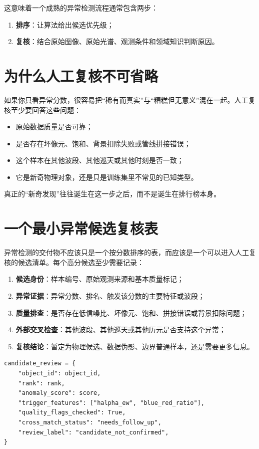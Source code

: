 这意味着一个成熟的异常检测流程通常包含两步：

\begin{enumerate}
    \item \textbf{排序}：让算法给出候选优先级；
    \item \textbf{复核}：结合原始图像、原始光谱、观测条件和领域知识判断原因。
\end{enumerate}

\section{为什么人工复核不可省略}

如果你只看异常分数，很容易把“稀有而真实”与“糟糕但无意义”混在一起。人工复核至少要回答这些问题：

\begin{itemize}
    \item 原始数据质量是否可靠；
    \item 是否存在坏像元、饱和、背景扣除失败或管线拼接错误；
    \item 这个样本在其他波段、其他巡天或其他时刻是否一致；
    \item 它是新奇物理对象，还是只是训练集里不常见的已知类型。
\end{itemize}

真正的“新奇发现”往往诞生在这一步之后，而不是诞生在排行榜本身。

\section{一个最小异常候选复核表}

异常检测的交付物不应该只是一个按分数排序的表，而应该是一个可以进入人工复核的候选清单。每个高分候选至少需要记录：

\begin{enumerate}
    \item \textbf{候选身份}：样本编号、原始观测来源和基本质量标记；
    \item \textbf{异常证据}：异常分数、排名、触发该分数的主要特征或波段；
    \item \textbf{质量排查}：是否存在低信噪比、坏像元、饱和、拼接错误或背景扣除问题；
    \item \textbf{外部交叉检查}：其他波段、其他巡天或其他历元是否支持这个异常；
    \item \textbf{复核结论}：暂定为物理候选、数据伪影、边界普通样本，还是需要更多信息。
\end{enumerate}

\begin{examplebox}[异常候选复核记录]
\begin{lstlisting}[style=pythonstyle]
candidate_review = {
    "object_id": object_id,
    "rank": rank,
    "anomaly_score": score,
    "trigger_features": ["halpha_ew", "blue_red_ratio"],
    "quality_flags_checked": True,
    "cross_match_status": "needs_follow_up",
    "review_label": "candidate_not_confirmed",
}
\end{lstlisting}
\end{examplebox}

